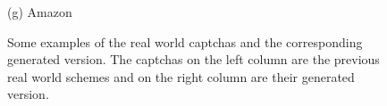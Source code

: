\begin{figure}
{\begin{minipage}[t]{0.2\textwidth}
        \center (g) Amazon
    \end{minipage}
    }
  \caption{Some examples of the real world captchas and the corresponding generated version. The captchas on the left column are the previous real world schemes and on the right column are their generated version.}
  \label{fig: generate_show}
\end{figure}

